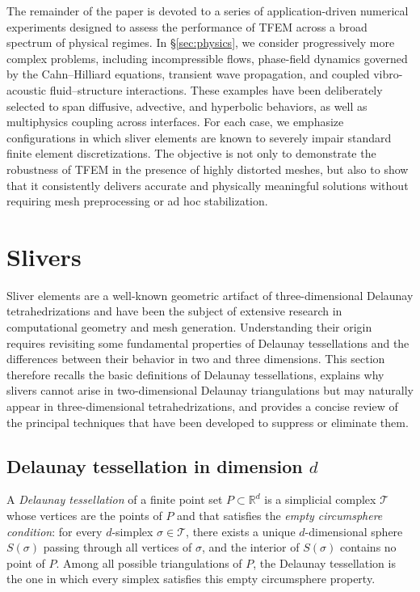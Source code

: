 \documentclass{article}
\begin{document}
The remainder of the paper is devoted to a series of application-driven numerical experiments designed to assess the performance of TFEM across a broad spectrum of physical regimes. In \S\ref{sec:physics}, we consider progressively more complex problems, including incompressible flows, phase-field dynamics governed by the Cahn–Hilliard equations, transient wave propagation, and coupled vibro-acoustic fluid–structure interactions. These examples have been deliberately selected to span diffusive, advective, and hyperbolic behaviors, as well as multiphysics coupling across interfaces. For each case, we emphasize configurations in which sliver elements are known to severely impair standard finite element discretizations. The objective is not only to demonstrate the robustness of TFEM in the presence of highly distorted meshes, but also to show that it consistently delivers accurate and physically meaningful solutions without requiring mesh preprocessing or ad hoc stabilization.



\section{Slivers}
\label{sec:slivers}
Sliver elements are a well-known geometric artifact of three-dimensional Delaunay tetrahedrizations and have been the subject of extensive research in computational geometry and mesh generation. Understanding their origin requires revisiting some fundamental properties of Delaunay tessellations and the differences between their behavior in two and three dimensions. This section therefore recalls the basic definitions of Delaunay tessellations, explains why slivers cannot arise in two-dimensional Delaunay triangulations but may naturally appear in three-dimensional tetrahedrizations, and provides a concise review of the principal techniques that have been developed to suppress or eliminate them.
\subsection{Delaunay tessellation in dimension $d$}
A \emph{Delaunay tessellation} of a finite point set 
$P \subset \mathbb{R}^d$ is a simplicial complex $\mathcal{T}$ whose 
vertices are the points of $P$ and that satisfies the \emph{empty circumsphere
condition}: for every $d$-simplex $\sigma \in \mathcal{T}$, there exists a 
unique 
$d$-dimensional sphere $S(\sigma)$ passing through all vertices of 
$\sigma$, and the interior of $S(\sigma)$ contains no point of $P$. 
Among all possible triangulations of $P$, the Delaunay tessellation is the one 
in which every simplex satisfies this empty circumsphere property.
\end{document}
